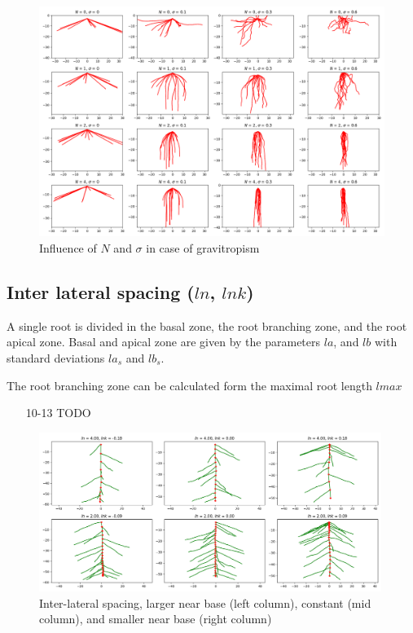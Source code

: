 \begin{figure}
\centering
\includegraphics[width=\textwidth]{fig_gravitropism.png}
\caption{Influence of $N$ and $\sigma$ in case of gravitropism} \label{fig:tropism}
\end{figure}




\subsection{Inter lateral spacing ($ln$, $lnk$)} \label{ssec:spacing}

A single root is divided in the basal zone, the root branching zone, and the root apical zone. Basal and apical zone are given by the parameters $la$, and $lb$ with standard deviations $la_s$ and $lb_s$. 

The root branching zone can be calculated form the maximal root length $lmax$



\begin{itemize}
\item[10-13] TODO
\end{itemize}
% 
\begin{figure}
\centering
\includegraphics[width=0.99\textwidth]{fig_lateralspacing.png}
\caption{Inter-lateral spacing, larger near base (left column), constant (mid column), and smaller near base (right column) } \label{fig:spacing}
\end{figure}



